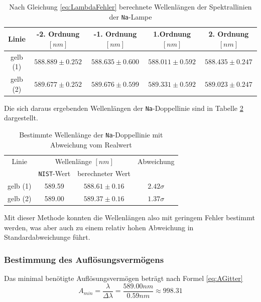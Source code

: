 \documentclass[a4paper, 11pt]{article}
\begin{document}
\begin{table}[H]
	\large
	\centering
	\begin{tabular}{|c|c|c|c|c|}
		\hline 
		Linie & -2. Ordnung $[nm]$  &   -1. Ordnung $[nm]$ &   1.Ordnung $[nm]$    &   2. Ordnung $[nm]$ \\
		\hline
		gelb (1) &   $588.889 \pm 0.252$   &   $588.635 \pm 0.600$    &   $588.011 \pm 0.592$    &   $588.435 \pm 0.247$ \\
		\hline
		gelb (2)  &   $589.677 \pm 0.252$   &   $589.676 \pm 0.599$    &   $589.331 \pm 0.592$    &   $589.023 \pm 0.247$ \\
		\hline
	\end{tabular}
	\caption{Nach Gleichung \ref{eq:LambdaFehler} berechnete Wellenlängen der Spektrallinien der \texttt{Na}-Lampe}
	\label{table:gemNaWellenlängen}
\end{table}

Die sich daraus ergebenden Wellenlängen der \texttt{Na}-Doppellinie sind in Tabelle \ref{table:NaWellenlängeErgebnisse} dargestellt.

\begin{table}[H]
	\large
	\centering
	\begin{tabular}{|c|c|c|c|}
		\hline
		Linie & \multicolumn{2}{|c|}{Wellenlänge $[nm]$} & Abweichung\\
				 &	\texttt{NIST}-Wert & berechneter Wert & \\
		\hline
		gelb (1) & 589.59 & $588.61 \pm 0.16$ & $2.42\sigma$ \\
		\hline
		gelb (2) & 589.00 & $589.37 \pm 0.16$ & $1.37\sigma$ \\
		\hline
	\end{tabular}
	\caption{Bestimmte Wellenlänge der \texttt{Na}-Doppellinie mit Abweichung vom Realwert}
	\label{table:NaWellenlängeErgebnisse}
\end{table}

Mit dieser Methode konnten die Wellenlängen also mit geringem Fehler bestimmt werden, was aber auch zu einem relativ hohen Abweichung in Standardabweichunge führt.


\subsubsection{Bestimmung des Auflösungsvermögens}
Das minimal benötigte Auflösungsvermögen beträgt nach Formel \ref{eq:AGitter}
\begin{equation*}
A_{min} = \frac{\lambda}{\Delta \lambda} = \frac{589.00nm}{0.59nm} \approx 998.31
\end{equation*}
\end{document}
